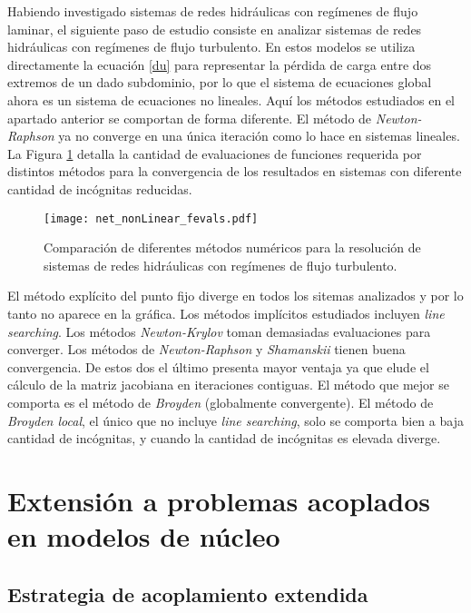 Habiendo investigado sistemas de redes hidráulicas con regímenes de flujo laminar,
el siguiente paso de estudio consiste en analizar sistemas de redes hidráulicas con regímenes de flujo turbulento.
En estos modelos se utiliza directamente la ecuación \ref{du} para representar la pérdida de carga entre dos extremos de un dado subdominio,
por lo que el sistema de ecuaciones global ahora es un sistema de ecuaciones no lineales.
Aquí los métodos estudiados en el apartado anterior se comportan de forma diferente.
El método de \textit{Newton-Raphson} ya no converge en una única iteración como lo hace en sistemas lineales.
La Figura \ref{net_nonLinear_fevals} detalla la cantidad de evaluaciones de funciones requerida por distintos métodos
para la convergencia de los resultados en sistemas con diferente cantidad de incógnitas reducidas.

\begin{figure}[ht]
\centering
\texttt{[image: net\_nonLinear\_fevals.pdf]}
\caption[Comparación de diferentes métodos numéricos para la resolución de sistemas de redes hidráulicas con regímenes de flujo turbulento]
{Comparación de diferentes métodos numéricos para la resolución de sistemas de redes hidráulicas con regímenes de flujo turbulento.}  
\label{net_nonLinear_fevals}
\end{figure}

El método explícito del punto fijo diverge en todos los sitemas analizados y por lo tanto no aparece en la gráfica.
Los métodos implícitos estudiados incluyen \textit{line searching}.
Los métodos \textit{Newton-Krylov} toman demasiadas evaluaciones para converger.
Los métodos de \textit{Newton-Raphson} y \textit{Shamanskii} tienen buena convergencia.
De estos dos el último presenta mayor ventaja ya que elude el cálculo de la matriz jacobiana en iteraciones contiguas.
El método que mejor se comporta es el método de \textit{Broyden} (globalmente convergente).
El método de \textit{Broyden local}, el único que no incluye \textit{line searching},
solo se comporta bien a baja cantidad de incógnitas, y cuando la cantidad de incógnitas es elevada diverge.

\section{Extensión a problemas acoplados en modelos de núcleo}
\label{3:extension-nucleo}

\subsection*{Estrategia de acoplamiento extendida}
\label{3:strategy-extended}

